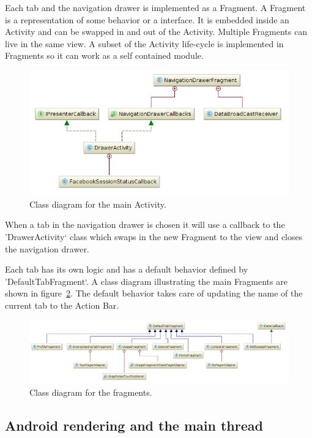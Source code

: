 Each tab and the navigation drawer is implemented as a Fragment. A Fragment is a representation of some behavior or a interface. It is embedded inside an Activity and can be swapped in and out of the Activity. Multiple Fragments can live in the same view. A subset of the Activity life-cycle is implemented in Fragments so it can work as a self contained module. 

\begin{figure}[H]
\includegraphics[width=\textwidth]{ch/architecture/fig/class_diagram_drawer.png}
\caption{Class diagram for the main Activity.}
\label{fig:class_diagram_drawer}
\end{figure}

When a tab in the navigation drawer is chosen it will use a callback to the 'DrawerActivity` class which swaps in the new Fragment to the view and closes the navigation drawer.

Each tab has its own logic and has a default behavior defined by 'DefaultTabFragment`. A class diagram illustrating the main Fragments are shown in figure~\ref{fig:class_diagram_fragments}. The default behavior takes care of updating the name of the current tab to the Action Bar.

\begin{figure}[H]
\includegraphics[width=\textwidth]{ch/architecture/fig/class_diagram_fragments.png}
\caption{Class diagram for the fragments.}
\label{fig:class_diagram_fragments}
\end{figure}

\subsection{Android rendering and the main thread}

